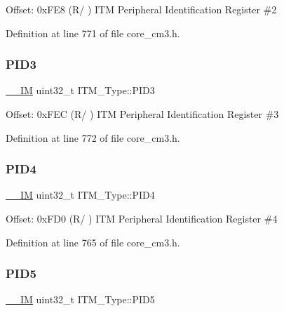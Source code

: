 Offset\+: 0x\+F\+E8 (R/ ) I\+TM Peripheral Identification Register \#2 

Definition at line 771 of file core\+\_\+cm3.\+h.

\mbox{\label{struct_i_t_m___type_af317d5e2d946d70e6fb67c02b92cc8a3}} 
\subsubsection{\texorpdfstring{P\+I\+D3}{PID3}}
{\footnotesize\ttfamily \hyperlink{core__sc300_8h_a4cc1649793116d7c2d8afce7a4ffce43}{\+\_\+\+\_\+\+IM} uint32\+\_\+t I\+T\+M\+\_\+\+Type\+::\+P\+I\+D3}

Offset\+: 0x\+F\+EC (R/ ) I\+TM Peripheral Identification Register \#3 

Definition at line 772 of file core\+\_\+cm3.\+h.

\mbox{\label{struct_i_t_m___type_aad5e11dd4baf6d941bd6c7450f60a158}} 
\subsubsection{\texorpdfstring{P\+I\+D4}{PID4}}
{\footnotesize\ttfamily \hyperlink{core__sc300_8h_a4cc1649793116d7c2d8afce7a4ffce43}{\+\_\+\+\_\+\+IM} uint32\+\_\+t I\+T\+M\+\_\+\+Type\+::\+P\+I\+D4}

Offset\+: 0x\+F\+D0 (R/ ) I\+TM Peripheral Identification Register \#4 

Definition at line 765 of file core\+\_\+cm3.\+h.

\mbox{\label{struct_i_t_m___type_af9085648bf18f69b5f9d1136d45e1d37}} 
\subsubsection{\texorpdfstring{P\+I\+D5}{PID5}}
{\footnotesize\ttfamily \hyperlink{core__sc300_8h_a4cc1649793116d7c2d8afce7a4ffce43}{\+\_\+\+\_\+\+IM} uint32\+\_\+t I\+T\+M\+\_\+\+Type\+::\+P\+I\+D5}

